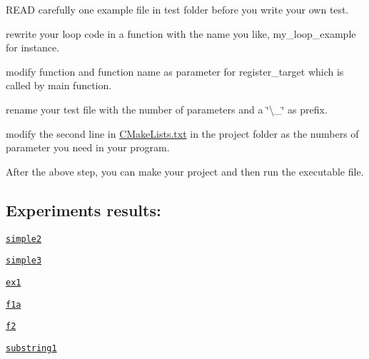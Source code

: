 \begin{DoxyItemize}
\item R\+E\+AD carefully one example file in test folder before you write your own test.
\item rewrite your loop code in a function with the name you like, my\+\_\+loop\+\_\+example for instance.
\item modify function and function name as parameter for register\+\_\+target which is called by main function.
\item rename your test file with the number of parameters and a \char`\"{}\textbackslash{}\+\_\+\char`\"{} as prefix.
\item modify the second line in \hyperlink{CMakeLists_8txt}{C\+Make\+Lists.\+txt} in the project folder as the numbers of parameter you need in your program.
\item After the above step, you can make your project and then run the executable file.
\end{DoxyItemize}

\subsection*{Experiments results\+:}


\begin{DoxyItemize}
\item \href{./results/simple2.html}{\tt simple2}
\item \href{./results/simple3.html}{\tt simple3}
\item \href{./results/ex1.html}{\tt ex1}
\item \href{./results/f1a.html}{\tt f1a}
\item \href{./results/f2.html}{\tt f2}
\item \href{./results/substring1.html}{\tt substring1} 
\end{DoxyItemize}